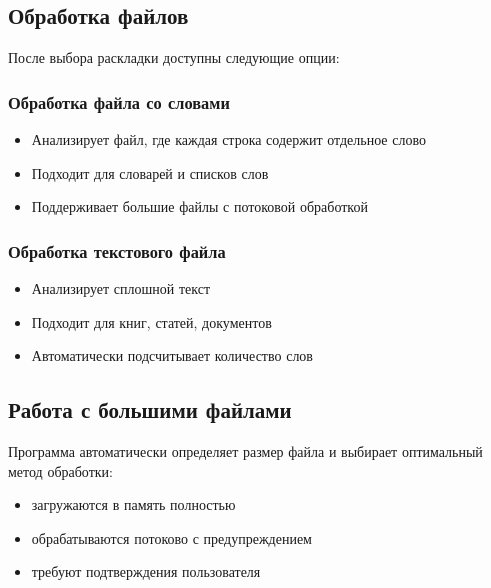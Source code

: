 \documentclass[a4paper,11pt,russian,openany,oneside]{sphinxmanual}
\begin{document}
\subsection{Обработка файлов}
\label{\detokenize{usage:id5}}
\sphinxAtStartPar
После выбора раскладки доступны следующие опции:


\subsubsection{Обработка файла со словами}
\label{\detokenize{usage:id6}}\begin{itemize}
\item {} 
\sphinxAtStartPar
Анализирует файл, где каждая строка содержит отдельное слово

\item {} 
\sphinxAtStartPar
Подходит для словарей и списков слов

\item {} 
\sphinxAtStartPar
Поддерживает большие файлы с потоковой обработкой

\end{itemize}


\subsubsection{Обработка текстового файла}
\label{\detokenize{usage:id7}}\begin{itemize}
\item {} 
\sphinxAtStartPar
Анализирует сплошной текст

\item {} 
\sphinxAtStartPar
Подходит для книг, статей, документов

\item {} 
\sphinxAtStartPar
Автоматически подсчитывает количество слов

\end{itemize}


\subsection{Работа с большими файлами}
\label{\detokenize{usage:id8}}
\sphinxAtStartPar
Программа автоматически определяет размер файла и выбирает оптимальный метод обработки:
\begin{itemize}
\item {} 
\sphinxAtStartPar
{} \sphinxhyphen{} загружаются в память полностью

\item {} 
\sphinxAtStartPar
{} \sphinxhyphen{} обрабатываются потоково с предупреждением

\item {} 
\sphinxAtStartPar
{} \sphinxhyphen{} требуют подтверждения пользователя

\end{itemize}
\end{document}
